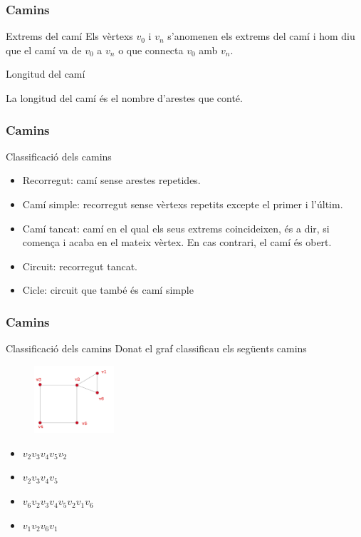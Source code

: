 \documentclass{beamer}
\begin{document}
\begin{frame}
\frametitle{Camins}
\begin{block}{Extrems del camí}
Els vèrtexs $v_0$ i $v_n$ s'anomenen els extrems del camí i hom diu que el camí va de $v_0$ a $v_n$ o que connecta $v_0$ amb $v_n$.
\end{block}

\begin{block}{Longitud del camí}

La longitud del camí és el nombre d'arestes que conté. 
\end{block}
\end{frame}





\begin{frame}
\frametitle{Camins}
\begin{block}{Classificació dels camins}
\begin{itemize}
\item Recorregut: camí sense arestes repetides.
\item Camí simple: recorregut sense vèrtexs repetits excepte el primer i l'últim.
\item Camí tancat: camí en el qual els seus extrems coincideixen, és a dir, si comença i acaba en el mateix vèrtex. En cas contrari, el camí és obert. 
\item Circuit: recorregut tancat.
\item Cicle: circuit que també és camí simple
\end{itemize}
\end{block}
\end{frame}






\begin{frame}
\frametitle{Camins}
\begin{block}{Classificació dels camins}
Donat el graf classificau els següents camins
\begin{figure}[h]
 \label{fig:volum}
\centering
\includegraphics[height=2.5cm]{g7}
\end{figure}
\begin{itemize}
\item $v_2v_3v_4v_5v_2$
\item $v_2v_3v_4v_5$
\item $v_6v_2v_3v_4v_5v_2v_1v_6$
\item $v_1v_2v_6v_1$
\end{itemize}
\end{block}
\end{frame}
\end{document}
